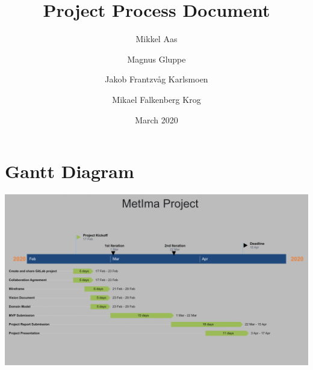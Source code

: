 \documentclass{article}
\title{Project Process Document}
\author{Mikkel Aas \and Magnus Gluppe \and Jakob Frantzvåg Karlsmoen \and Mikael Falkenberg Krog}
\date{March 2020}
\begin{document}
\maketitle


\section*{Gantt Diagram}
\includegraphics[width=\textwidth]{Gantt_Diagram.png}



\end{document}
